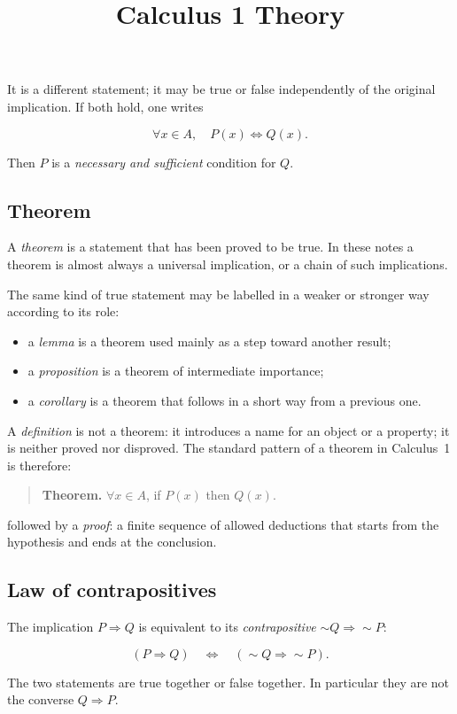 \documentclass[11pt,a4paper]{article} \usepackage[T1]{fontenc}
\theoremstyle{plain} \newtheorem{theorem}{Theorem} \title{Calculus 1 Theory}
\begin{document}
It is a different statement; it may be true or false independently of the
original implication. If both hold, one writes

\[
\forall x\in A,\quad P(x)\Leftrightarrow Q(x).
\]

Then $P$ is a \emph{necessary and sufficient} condition for $Q$.

\subsection{Theorem}

\begin{definition}
[Theorem] A \emph{theorem} is a statement that has been proved to be true. In
these notes a theorem is almost always a universal implication, or a chain of
such implications.
\end{definition}

The same kind of true statement may be labelled in a weaker or stronger way
according to its role:

\begin{itemize}
\item a \emph{lemma} is a theorem used mainly as a step toward another result;
\item a \emph{proposition} is a theorem of intermediate importance;
\item a \emph{corollary} is a theorem that follows in a short way from a
previous one.
\end{itemize}

A \emph{definition} is not a theorem: it introduces a name for an object or a
property; it is neither proved nor disproved. The standard pattern of a theorem
in Calculus~1 is therefore:

\begin{quote}
\textbf{Theorem.} $\forall x\in A$, if $P(x)$ then $Q(x)$.
\end{quote}

followed by a \emph{proof}: a finite sequence of allowed deductions that starts
from the hypothesis and ends at the conclusion.

\subsection{Law of contrapositives}

\begin{definition}
 The implication $P\Rightarrow Q$ is equivalent to its
\emph{contrapositive} $\sim Q\Rightarrow \sim P$:

\[
(P\Rightarrow Q)\quad\Leftrightarrow\quad (\sim Q\Rightarrow \sim P).
\]

The two statements are true together or false together. In particular they are
not the converse $Q\Rightarrow P$.
\end{definition}
\end{document}
